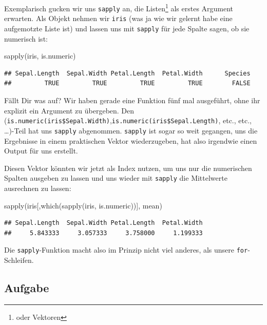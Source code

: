 \documentclass[
]{book}
\newenvironment{Shaded}{\begin{snugshade}}{\end{snugshade}}
\newcommand{\FunctionTok}[1]{\textcolor[rgb]{0.00,0.00,0.00}{#1}}
\newcommand{\NormalTok}[1]{#1}
\begin{document}
Exemplarisch gucken wir uns \texttt{sapply} an, die Listen\footnote{oder Vektoren} als erstes Argument erwarten.
Als Objekt nehmen wir \texttt{iris} (was ja wie wir gelernt habe eine aufgemotzte Liste ist) und lassen uns mit \texttt{sapply} für jede Spalte sagen, ob sie numerisch ist:

\begin{Shaded}
\begin{Highlighting}[]
\FunctionTok{sapply}\NormalTok{(iris, is.numeric)}
\end{Highlighting}
\end{Shaded}

\begin{verbatim}
## Sepal.Length  Sepal.Width Petal.Length  Petal.Width      Species 
##         TRUE         TRUE         TRUE         TRUE        FALSE
\end{verbatim}

Fällt Dir was auf?
Wir haben gerade eine Funktion fünf mal ausgeführt, ohne ihr explizit ein Argument zu übergeben. Den (\texttt{is.numeric(iris\$Sepal.Width)},\texttt{is.numeric(iris\$Sepal.Length)}, etc., etc., \ldots)-Teil hat uns \texttt{sapply} abgenommen. \texttt{sapply} ist sogar so weit gegangen, uns die Ergebnisse in einem praktischen Vektor wiederzugeben, hat also irgendwie einen Output für uns erstellt.

Diesen Vektor könnten wir jetzt als Index nutzen, um uns nur die numerischen Spalten ausgeben zu lassen und uns wieder mit \texttt{sapply} die Mittelwerte ausrechnen zu lassen:

\begin{Shaded}
\begin{Highlighting}[]
\FunctionTok{sapply}\NormalTok{(iris[,}\FunctionTok{which}\NormalTok{(}\FunctionTok{sapply}\NormalTok{(iris, is.numeric))],}
\NormalTok{       mean)}
\end{Highlighting}
\end{Shaded}

\begin{verbatim}
## Sepal.Length  Sepal.Width Petal.Length  Petal.Width 
##     5.843333     3.057333     3.758000     1.199333
\end{verbatim}

Die \texttt{sapply}-Funktion macht also im Prinzip nicht viel anderes, als unsere \texttt{for}-Schleifen.

\hypertarget{aufgabe-9}{%
\subsection{Aufgabe}\label{aufgabe-9}}
\end{document}
